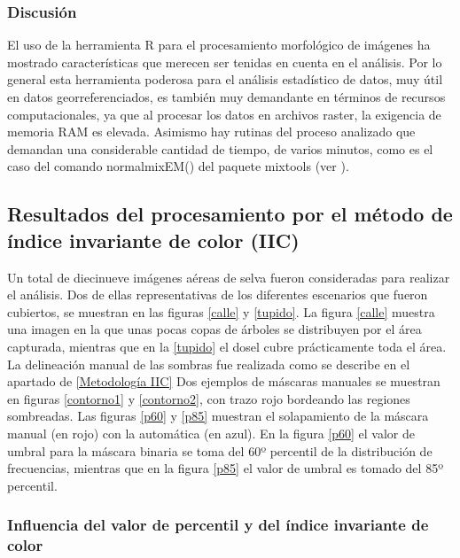\subsubsection{Discusión}
El uso de la herramienta R para el procesamiento morfológico de imágenes ha mostrado características que merecen ser tenidas en cuenta en el análisis. Por lo general esta herramienta poderosa para el análisis estadístico de datos, muy útil en datos georreferenciados, es también muy demandante en términos de recursos computacionales, ya que al procesar los datos en archivos raster, la exigencia de memoria RAM es elevada. Asimismo hay rutinas del proceso analizado que demandan una considerable cantidad de tiempo, de varios minutos, como es el caso del comando  normalmixEM() del paquete mixtools (ver \cite{young__aut_mixtools_2022}).


\subsection{Resultados del procesamiento por el método de índice invariante de color (IIC)} \label{Resultados IIC}
Un total de diecinueve imágenes aéreas de selva fueron consideradas para realizar el análisis. Dos de ellas representativas de los diferentes escenarios que fueron cubiertos, se muestran en las figuras \ref{calle} y \ref{tupido}. La figura \ref{calle} muestra una imagen en la que unas pocas copas de árboles se distribuyen por el área capturada, mientras que en la \ref{tupido} el dosel cubre prácticamente toda el área. La delineación manual de las sombras fue realizada como se describe en el apartado de \ref{Metodología IIC}
Dos ejemplos de máscaras manuales se muestran en figuras \ref{contorno1} y \ref{contorno2}, con trazo rojo bordeando las regiones sombreadas. Las figuras \ref{p60} y \ref{p85} muestran el solapamiento de la máscara manual (en rojo) con la automática (en azul). En la figura \ref{p60} el valor de umbral para la máscara binaria se toma del 60º percentil de la distribución de frecuencias, mientras que en la figura \ref{p85} el valor de umbral es tomado del 85º percentil.



\subsubsection{Influencia del valor de percentil y del índice invariante de color}

